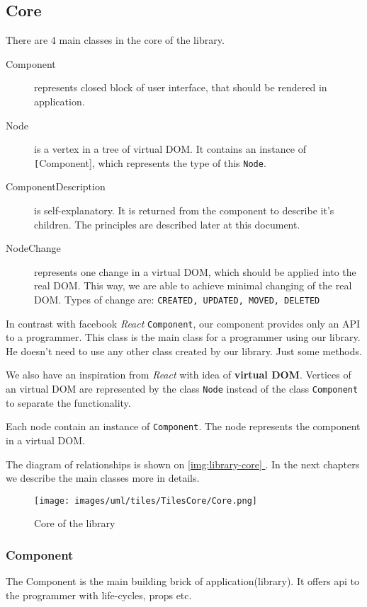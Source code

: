 \documentclass[oneside, 12pt]{book}
\newcommand*{\fullref}[1]{\hyperref[{#1}]{\autoref*{#1} \nameref*{#1}}}
\begin{document}
  \subsection{Core}\label{subsec:our-architecture-core}
    There are 4 main classes in the core of the library.
    \begin{description}
      \item[Component] 
        represents closed block of user interface, 
        that should be rendered in application.
      \item[Node]
        is a vertex in a tree of virtual DOM. 
        It contains an instance of \texttt[Component], which represents the type of this \texttt{Node}.
      \item[ComponentDescription]
        is self-explanatory. 
        It is returned from the component to describe it's children. 
				The principles are described later at this document.
      \item[NodeChange]
        represents one change in a virtual DOM, which should be applied into the real DOM. 
        This way, we are able to achieve minimal changing of the real DOM. 
        Types of change are: \texttt{CREATED, UPDATED, MOVED, DELETED}
    \end{description}

		In contrast with facebook \textit{React} \texttt{Component}, our component provides only an API to a programmer.
    This class is the main class for a programmer using our library. 
		He doesn't need to use any other class created by our library. 
    Just some methods.

		We also have an inspiration from \textit{React} with idea of \textbf{virtual DOM}. 
		Vertices of an virtual DOM are represented by the class \texttt{Node} instead of the class \texttt{Component} to separate the functionality. 

    Each node contain an instance of \texttt{Component}. 
		The node represents the component in a virtual DOM.
    
    The diagram of relationships is shown on \fullref{img:library-core}. 
		In the next chapters we describe the main classes more in details.
    \begin{figure}[h]
    \centering  
      \texttt{[image: images/uml/tiles/TilesCore/Core.png]}
      \caption{Core of the library}
      \label{img:library-core}
    \end{figure}

    \subsubsection{Component}\label{subsubsec:our-architecture-core-component}
      The Component is the main building brick of application(library). 
      It offers api to the programmer with life-cycles, props etc. 
\end{document}
